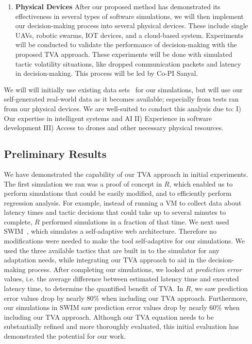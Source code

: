 \documentclass[11pt]{proposalnsf}
\newlength\q %
\begin{document}
\begin{sloppypar}
\begin{enumerate}[noitemsep]
	\item \textbf{Physical Devices} After our proposed method has demonstrated its effectiveness in several types of software simulations, we will then implement our decision-making process into several physical devices. These include single UAVs, robotic swarms, IOT devices, and a cloud-based system. Experiments will be conducted to validate the performance of decision-making with the proposed TVA approach. These experiments will be done with simulated tactic volatility situations, like dropped communication packets and latency in decision-making. This process will be led by Co-PI Sanyal.

\end{enumerate}

We will will initially use existing data sets~\cite{ita.ee.lbl.gov_URL} for our simulations, but will use our self-generated real-world data as it becomes available; especially from tests ran from our physical devices. We are well-suited to conduct this analysis due to: I) Our expertise in intelligent systems and AI II) Experience in software development III) Access to drones and other necessary physical resources. 

\subsection{Preliminary Results}
We have demonstrated the capability of our TVA approach in initial experiments. The first simulation we ran was a proof of concept in $R$, which enabled us to perform simulations that could be easily modified, and to efficiently perform regression analysis. For example, instead of running a VM to collect data about latency times and tactic decisions that could take up to several minutes to complete, $R$ performed simulations in a fraction of that time. We next used SWIM~\cite{SWIM_URL}, which simulates a self-adaptive web architecture. Therefore no modifications were needed to make the tool self-adaptive for our simulations. We used the three available tactics that are built in to the simulator for any adaptation needs, while integrating our TVA approach to aid in the decision-making process. After completing our simulations, we looked at \textit{prediction error} values, i.e. the average difference between estimated latency time and executed latency time, to determine the quantified benefit of TVA. In $R$, we saw prediction error values drop by nearly 80\% when including our TVA approach. Furthermore, our simulations in SWIM saw prediction error values drop by nearly 60\% when including our TVA approach. Although our TVA equation needs to be substantially refined and more thoroughly evaluated, this initial evaluation has demonstrated the potential for our work.


\end{sloppypar}
\end{document}
